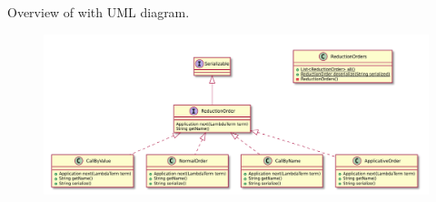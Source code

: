 Overview of \texttt{\pkg} with UML diagram.

\begin{figure}[H]
	\centering
	\includegraphics[width=\textwidth]{packageDiagrams/reductionPackage}
\end{figure}
